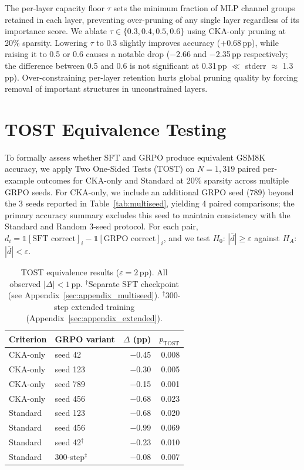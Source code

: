 The per-layer capacity floor $\tau$ sets the minimum fraction of MLP channel groups retained in each layer, preventing over-pruning of any single layer regardless of its importance score.
We ablate $\tau \in \{0.3, 0.4, 0.5, 0.6\}$ using CKA-only pruning at 20\% sparsity.
Lowering $\tau$ to 0.3 slightly improves accuracy ($+$0.68\,pp), while raising it to 0.5 or 0.6 causes a notable drop ($-$2.66 and $-$2.35\,pp respectively; the difference between 0.5 and 0.6 is not significant at 0.31\,pp $\ll$ stderr $\approx$ 1.3\,pp).
Over-constraining per-layer retention hurts global pruning quality by forcing removal of important structures in unconstrained layers.

\section{TOST Equivalence Testing}
\label{sec:appendix_tost}

To formally assess whether SFT and GRPO produce equivalent GSM8K accuracy, we apply Two One-Sided Tests (TOST) on $N{=}1{,}319$ paired per-example outcomes for CKA-only and Standard at 20\% sparsity across multiple GRPO seeds.
For CKA-only, we include an additional GRPO seed (789) beyond the 3 seeds reported in Table~\ref{tab:multiseed}, yielding 4 paired comparisons; the primary accuracy summary excludes this seed to maintain consistency with the Standard and Random 3-seed protocol.
For each pair, $d_i = \mathbb{1}[\text{SFT correct}]_i - \mathbb{1}[\text{GRPO correct}]_i$, and we test $H_0$: $|\bar{d}| \geq \varepsilon$ against $H_A$: $|\bar{d}| < \varepsilon$.

\begin{table}[h]
\centering
\small
\caption{TOST equivalence results ($\varepsilon{=}2$\,pp). All observed $|\Delta|{<}1$\,pp. $^\dagger$Separate SFT checkpoint (see Appendix~\ref{sec:appendix_multiseed}). $^\ddagger$300-step extended training (Appendix~\ref{sec:appendix_extended}).}
\label{tab:tost}
\begin{tabular}{@{}llrr@{}}
\toprule
Criterion & GRPO variant & $\Delta$ (pp) & $p_\text{TOST}$ \\
\midrule
CKA-only & seed 42 & $-$0.45 & 0.008 \\
CKA-only & seed 123 & $-$0.30 & 0.005 \\
CKA-only & seed 789 & $-$0.15 & 0.001 \\
CKA-only & seed 456 & $-$0.68 & 0.023 \\
\midrule
Standard & seed 123 & $-$0.68 & 0.020 \\
Standard & seed 456 & $-$0.99 & 0.069 \\
Standard & seed 42$^\dagger$ & $-$0.23 & 0.010 \\
Standard & 300-step$^\ddagger$ & $-$0.08 & 0.007 \\
\bottomrule
\end{tabular}
\end{table}

